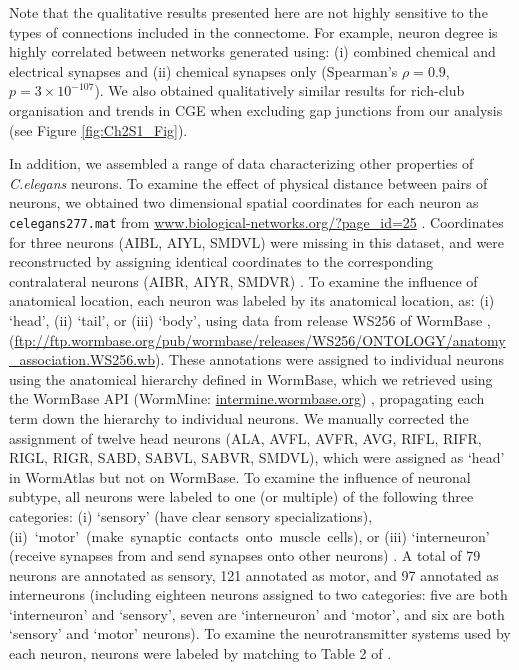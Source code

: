 Note that the qualitative results presented here are not highly sensitive to the types of connections included in the connectome.
For example, neuron degree is highly correlated between networks generated using: (i) combined chemical and electrical synapses and (ii) chemical synapses only (Spearman's $\rho= 0.9$, $p = 3 \times 10^{-107}$).
We also obtained qualitatively similar results for rich-club organisation and trends in CGE when excluding gap junctions from our analysis (see Figure \ref{fig:Ch2S1_Fig}).

In addition, we assembled a range of data characterizing other properties of \emph{C.elegans} neurons.
To examine the effect of physical distance between pairs of neurons, we obtained two dimensional spatial coordinates for each neuron as \texttt{celegans277.mat} from \url{www.biological-networks.org/?page_id=25} \citep{Choe2004}.
Coordinates for three neurons (AIBL, AIYL, SMDVL) were missing in this dataset, and were reconstructed by assigning identical coordinates to the corresponding contralateral neurons (AIBR, AIYR, SMDVR) \citep{Varier2011}.
To examine the influence of anatomical location, each neuron was labeled by its anatomical location, as:
(i) `head', (ii) `tail', or (iii) `body', using data from release WS256 of WormBase \citep{Harris2010}, (\url{ftp://ftp.wormbase.org/pub/wormbase/releases/WS256/ONTOLOGY/anatomy_association.WS256.wb}).
These annotations were assigned to individual neurons using the anatomical hierarchy defined in WormBase, which we retrieved using the WormBase API (WormMine: \url{intermine.wormbase.org}) \citep{Harris2010}, propagating each term down the hierarchy to individual neurons.
We manually corrected the assignment of twelve head neurons (ALA, AVFL, AVFR, AVG, RIFL, RIFR, RIGL, RIGR, SABD, SABVL, SABVR, SMDVL), which were assigned as `head' in WormAtlas \citep{WormAtlas} but not on WormBase.
To examine the influence of neuronal subtype, all neurons were labeled to one (or multiple) of the following three categories:
(i) `sensory' (have clear sensory specializations),
\mbox{(ii) `motor' (make synaptic contacts onto muscle cells)}, or
(iii) `interneuron' (receive synapses from and send synapses onto other neurons) \citep{White1986}.
A total of 79 neurons are annotated as sensory, 121 annotated as motor, and 97 annotated as interneurons (including eighteen neurons assigned to two categories: five are both `interneuron' and `sensory', seven are `interneuron' and `motor', and six are both `sensory' and `motor' neurons).
To examine the neurotransmitter systems used by each neuron, neurons were labeled by matching to Table 2 of \citet{Pereira2015}.
